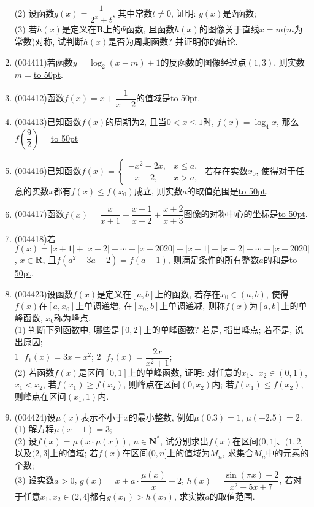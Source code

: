 \documentclass[10pt,a4paper]{article}
\newcommand{\blank}[1]{\underline{\hbox to #1pt{}}}
\begin{document}
\begin{enumerate}[1.]
(2) 设函数$g(x)=\dfrac 1{2^x+t}$, 其中常数$t\ne 0$, 证明: $g(x)$是$\Psi$函数;\\
(3) 若$h(x)$是定义在$\mathbf{R}$上的$\Psi$函数, 且函数$h(x)$的图像关于直线$x=m$($m$为常数)对称, 试判断$h(x)$是否为周期函数? 并证明你的结论.
\item {\tiny (004411)}若函数$y=\log_2(x-m)+1$的反函数的图像经过点$(1,3)$, 则实数$m=$\blank{50}.
\item {\tiny (004412)}函数$f(x)=x+\dfrac 1{x-2}$的值域是\blank{50}.
\item {\tiny (004413)}已知函数$f(x)$的周期为$2$, 且当$0<x\le 1$时, $f(x)=\log_4x$, 那么$f(\dfrac 92)=$\blank{50}
\item {\tiny (004416)}已知函数$f(x)=\begin{cases}  -x^2-2x, & x\le a,  \\-x+2, &x>a,  \end{cases}$ 若存在实数$x_0$, 使得对于任意的实数$x$都有$f(x)\le f(x_0)$成立, 则实数$a$的取值范围是\blank{50}.
\item {\tiny (004417)}函数$f(x)=\dfrac x{x+1}+\dfrac{x+1}{x+2}+\dfrac{x+2}{x+3}$图像的对称中心的坐标是\blank{50}.
\item {\tiny (004418)}若$f(x)=|x+1|+|x+2|+\cdots +|x+2020|+|x-1|+|x-2|+\cdots +|x-2020|$, $x\in \mathbf{R}$, 且$f(a^2-3a+2)=f(a-1)$, 则满足条件的所有整数$a$的和是\blank{50}.
\item {\tiny (004423)}设函数$f(x)$是定义在$[a,b]$上的函数, 若存在$x_0\in (a,b)$, 使得$f(x)$在$[a,x_0]$上单调递增, 在$[x_0,b]$上单调递减, 则称$f(x)$为$[a,b]$上的单峰函数, $x_0$称为峰点.\\
(1) 判断下列函数中, 哪些是$[0,2]$上的单峰函数? 若是, 指出峰点; 若不是, 说出原因;\\
\textcircled{1}  $f_1(x)=3x-x^2$; \textcircled{2}  $f_2(x)=\dfrac{2x}{{x^2}+1}$;\\
(2) 若函数$f(x)$是区间$[0,1]$上的单峰函数, 证明: 对任意的$x_1$、$x_2\in (0,1)$, $x_1<x_2$, 若$f(x_1)\ge f(x_2)$, 则峰点在区间$(0,x_2)$内; 若$f(x_1)\le f(x_2)$, 则峰点在区间$(x_1,1)$内.
\item {\tiny (004424)}设$\mu (x)$表示不小于$x$的最小整数, 例如$\mu(0.3)=1$, $\mu(-2.5)=2$.\\
(1) 解方程$\mu(x-1)=3$;\\
(2) 设$f(x)=\mu (x\cdot \mu (x))$, $n\in \mathbf{N}^*$, 试分别求出$f(x)$在区间$(0,1]$、$(1,2]$以及$(2,3]$上的值域; 若$f(x)$在区间$(0,n]$上的值域为$M_n$, 求集合$M_n$中的元素的个数;\\
(3) 设实数$a>0$, $g(x)=x+a\cdot \dfrac{\mu (x)}x-2$, $h(x)=\dfrac{\sin (\pi x)+2}{x^2-5x+7}$, 若对于任意$x_1,x_2\in (2,4]$都有$g(x_1)>h(x_2)$, 求实数$a$的取值范围.

\end{enumerate}
\end{document}
